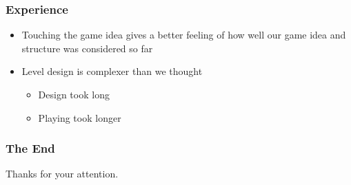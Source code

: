\documentclass[xcolor=dvipsnames]{beamer}
\begin{document}
	\begin{frame}
		\frametitle{Experience}
		\begin{itemize}
			\setlength\itemsep{5em}
			\item Touching the game idea gives a better feeling of how well our game idea and structure was considered so far
			\item Level design is complexer than we thought
			\begin{itemize}
				\item Design took long
				\item Playing took longer
			\end{itemize}
		\end{itemize}
	\end{frame}
	
	\begin{frame}
		\frametitle{The End}
		\centering
		\Huge
		Thanks for your attention.
	\end{frame}
\end{document}
